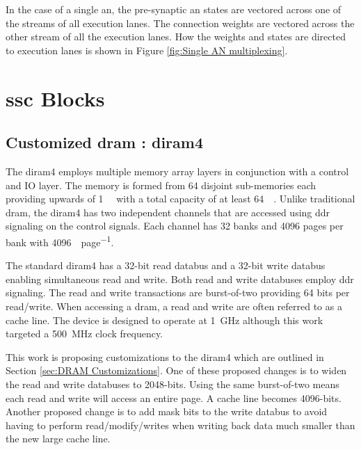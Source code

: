 In the case of a single \ac{an}, the pre-synaptic \ac{an} states are vectored across one of the streams of all execution lanes.
The connection weights are vectored across the other stream of all the execution lanes.
How the weights and states are directed to execution lanes is shown in Figure \ref{fig:Single AN multiplexing}.


\section{\acf{ssc} Blocks}
\label{sec:SSC Blocks}

\subsection{Customized \ac{dram} : \acf{diram4}}
\label{sec:3ddram}
The \ac{diram4} \cite{tezzaron:diram4} employs multiple memory array layers in conjunction with a control and IO layer.
The memory is formed from 64 disjoint sub-memories each providing upwards of \SI[per-mode=symbol]{1}{\giga\bit} with a total capacity of at least \SI[per-mode=symbol]{64}{\giga\bit}.
Unlike traditional \ac{dram}, the \ac{diram4} has two independent channels that are accessed using \ac{ddr} signaling on the control signals.
Each channel has 32 banks and 4096 pages per bank with \SI[per-mode=symbol]{4096}{\bit\per page}.

The standard \ac{diram4} has a 32-bit read databus and a 32-bit write databus enabling simultaneous read and write. Both read and write databuses employ \ac{ddr} signaling.
The read and write transactions are burst-of-two providing 64 bits per read/write. When accessing a \ac{dram}, a read and write are often referred to as a cache line.
The device is designed to operate at \SI[per-mode=symbol]{1}{\giga\hertz} although this work targeted a \SI[per-mode=symbol]{500}{\mega\hertz} clock frequency.

This work is proposing customizations to the \ac{diram4} which are outlined in Section \ref{sec:DRAM Customizations}. One of these proposed changes is to widen the read and write databuses to 2048-bits.
Using the same burst-of-two means each read and write will access an entire page. A cache line becomes 4096-bits.
Another proposed change is to add mask bits to the write databus to avoid having to perform read/modify/writes when writing back data much smaller than the new large cache line.

